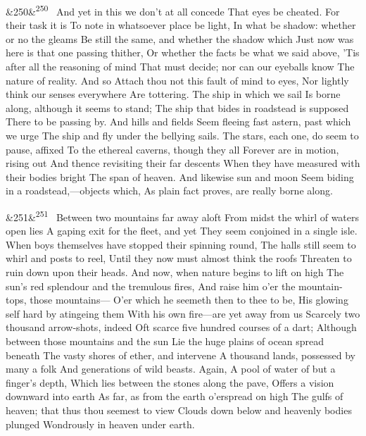 \documentclass[12pt]{article}
\newcommand{\para}[1][]{\par\noindent\ifx&#1&\else\textsuperscript{\footnotesize #1}~\fi}
\begin{document}
\para[250] And yet in this we don't at all concede That eyes be cheated. For their task it is To note in whatsoever place be light, In what be shadow: whether or no the gleams Be still the same, and whether the shadow which Just now was here is that one passing thither, Or whether the facts be what we said above, 'Tis after all the reasoning of mind That must decide; nor can our eyeballs know The nature of reality. And so Attach thou not this fault of mind to eyes, Nor lightly think our senses everywhere Are tottering. The ship in which we sail Is borne along, although it seems to stand; The ship that bides in roadstead is supposed There to be passing by. And hills and fields Seem fleeing fast astern, past which we urge The ship and fly under the bellying sails. The stars, each one, do seem to pause, affixed To the ethereal caverns, though they all Forever are in motion, rising out And thence revisiting their far descents When they have measured with their bodies bright The span of heaven. And likewise sun and moon Seem biding in a roadstead,---objects which, As plain fact proves, are really borne along.

\para[251] Between two mountains far away aloft From midst the whirl of waters open lies A gaping exit for the fleet, and yet They seem conjoined in a single isle. When boys themselves have stopped their spinning round, The halls still seem to whirl and posts to reel, Until they now must almost think the roofs Threaten to ruin down upon their heads. And now, when nature begins to lift on high The sun's red splendour and the tremulous fires, And raise him o'er the mountain-tops, those mountains--- O'er which he seemeth then to thee to be, His glowing self hard by atingeing them With his own fire---are yet away from us Scarcely two thousand arrow-shots, indeed Oft scarce five hundred courses of a dart; Although between those mountains and the sun Lie the huge plains of ocean spread beneath The vasty shores of ether, and intervene A thousand lands, possessed by many a folk And generations of wild beasts. Again, A pool of water of but a finger's depth, Which lies between the stones along the pave, Offers a vision downward into earth As far, as from the earth o'erspread on high The gulfs of heaven; that thus thou seemest to view Clouds down below and heavenly bodies plunged Wondrously in heaven under earth.
\end{document}
